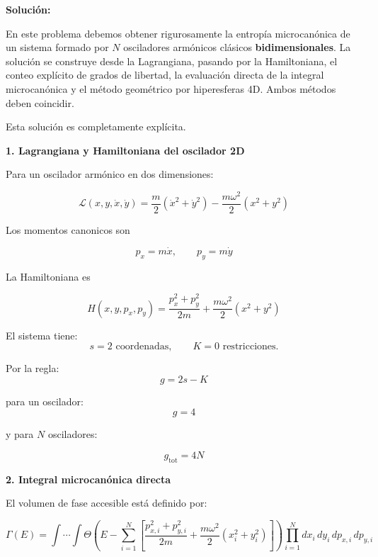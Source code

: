 \documentclass{article}
\begin{document}
\textcolor{Tuscany}{\textbf{Solución:}}

En este problema debemos obtener rigurosamente la entropía microcanónica de un sistema
formado por \(N\) osciladores armónicos clásicos \textbf{bidimensionales}.
La solución se construye desde la Lagrangiana, pasando por la Hamiltoniana,
el conteo explícito de grados de libertad, la evaluación directa de la integral
microcanónica y el método geométrico por hiperesferas 4D.
Ambos métodos deben coincidir.  

Esta solución es completamente explícita.


\textcolor{Apple Green}{\textbf{1. Lagrangiana y Hamiltoniana del oscilador 2D}}

Para un oscilador armónico en dos dimensiones:

\[
\mathcal{L}(x,y,\dot x,\dot y)
= \frac{m}{2}(\dot x^{2} + \dot y^{2})
  - \frac{m\omega^{2}}{2}(x^{2} + y^{2})
\]

Los momentos canonicos son

\[
p_{x} = m\dot x,
\qquad
p_{y} = m\dot y
\]

La Hamiltoniana es

\[
H(x,y,p_{x},p_{y})
= \frac{p_{x}^{2}+p_{y}^{2}}{2m}
  + \frac{m\omega^{2}}{2}(x^{2}+y^{2})
\]

El sistema tiene:
\[
s = 2 \text{ coordenadas},\qquad
K=0 \text{ restricciones}.
\]

Por la regla:
\[
g = 2s - K
\]

para un oscilador:
\[
g = 4
\]

y para \(N\) osciladores:

\[
\boxed{g_{\text{tot}} = 4N}
\]


\textcolor{Apple Green}{\textbf{2. Integral microcanónica directa}}

El volumen de fase accesible está definido por:

\[
\Gamma(E) =
\int\cdots\int
\Theta\!\left(
E - \sum_{i=1}^{N}
\left[
\frac{p_{x,i}^{2}+p_{y,i}^{2}}{2m}
+\frac{m\omega^{2}}{2}(x_{i}^{2}+y_{i}^{2})
\right]
\right)
\prod_{i=1}^{N}
dx_{i}\,dy_{i}\,dp_{x,i}\,dp_{y,i}
\]
\end{document}
